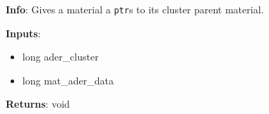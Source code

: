 \textbf{Info}: Gives a material a \texttt{ptr}s to its cluster parent material.

\noindent \textbf{Inputs}:
\begin{itemize}
\item{long ader\_cluster}
\item{long mat\_ader\_data}
\end{itemize}

\noindent \textbf{Returns}: void
